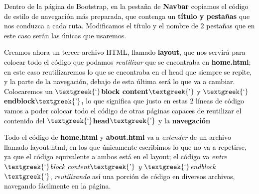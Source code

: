 \documentclass[a4paper]{article}
\begin{document}



\bigskip

{
\textcolor{black}{Dentro de la página de Bootstrap, en la pestaña de
}\textbf{\textcolor{black}{Navbar}}\textcolor{black}{ copiamos el código de estilo de navegación más preparada, que
contenga un }\textbf{\textcolor{black}{título y pestañas}}\textcolor{black}{ que nos conduzca a cada ruta. Modificamos
el título y el nombre de 2 pestañas que en este caso serán las únicas que usaremos.}}





\bigskip

{
\textcolor{black}{Creamos ahora un tercer archivo HTML, llamado }\textbf{\textcolor{black}{layout}}\textcolor{black}{,
que nos servirá para colocar todo el código que podamos }\textit{\textcolor{black}{reutilizar}}\textcolor{black}{ que
se encontraba en }\textbf{\textcolor{black}{home.html}}\textcolor{black}{; en este caso reutilizaremos lo que se
encontraba en el head que siempre se repite, y la parte de la navegación, debajo de esta última será lo que va a
cambiar. Colocaremos un }\textbf{\textcolor{black}{$\text{\textgreek{‘}}$block
content$\text{\textgreek{’}}$}}\textcolor{black}{ y
}\textbf{\textcolor{black}{$\text{\textgreek{‘}}$endblock$\text{\textgreek{’}}$,}}\textcolor{black}{ lo que significa
que justo en estas 2 líneas de código vamos a poder colocar todo el código de otras páginas capaces de reutilizar el
contenido del }\textbf{\textcolor{black}{$\text{\textgreek{‘}}$head$\text{\textgreek{’}}$ }}\textcolor{black}{y la
}\textbf{\textcolor{black}{navegación}}}


{
\textcolor{black}{Todo el código de }\textbf{\textcolor{black}{home.html}}\textcolor{black}{ y
}\textbf{\textcolor{black}{about.html}}\textcolor{black}{ va a }\textit{\textcolor{black}{extender}}\textcolor{black}{
de un archivo llamado layout.html, en los que únicamente escribimos lo que no va a repetirse, ya que el código
equivalente a ambos está en el layout; el código va }\textit{\textcolor{black}{entre $\text{\textgreek{‘}}$block
content$\text{\textgreek{’}}$ y $\text{\textgreek{‘}}$endblock$\text{\textgreek{’}}$}}\textcolor{black}{,
}\textit{\textcolor{black}{reutilizando}}\textcolor{black}{ así una porción de código en diversos archivos, navegando
fácilmente en la página.}}
\end{document}
